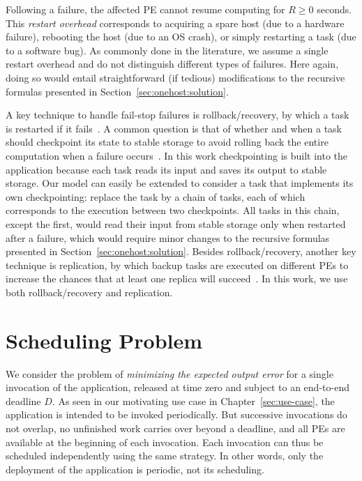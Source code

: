 Following a failure, the affected PE cannot resume computing for $R{\geq}
0$ seconds. This \emph{restart overhead} corresponds to acquiring a spare
host (due to a hardware failure), rebooting the host (due to an OS
crash), or simply restarting a task (due to a software bug).  As
commonly done in the literature, we assume a single restart overhead and do
not distinguish different types of failures. Here again, doing so would
entail straightforward (if tedious) modifications to the recursive
formulas presented in Section~\ref{sec:onehost:solution}.

A key technique to handle fail-stop failures is rollback/recovery, by
which a task is restarted if it fails~\cite{10.5555/2811302}.  A common
question is that of whether and when a task should
checkpoint its state to stable storage to avoid rolling back the entire
computation when a failure occurs~\cite{BAUTISTAGOMEZ2024315}.  In this
work checkpointing is built into the application because each task reads
its input and saves its output to stable storage.  Our model can easily
be extended to consider a task that implements its own checkpointing:
replace the task by a chain of tasks, each of which corresponds to the
execution between two checkpoints. All tasks in this chain, except the
first, would read their input from stable storage only when restarted
after a failure, which would require minor changes to the recursive
formulas presented in Section~\ref{sec:onehost:solution}.  Besides
rollback/recovery, another key technique is replication, by which backup
tasks are executed on different PEs to increase the chances that at least
one replica will succeed~\cite{10.5555/2811302}.  In this work, we 
use both rollback/recovery and replication.



\section{Scheduling Problem}
\label{sec:problem-scheduling}

We consider the problem of \emph{minimizing the expected output error} for
a single invocation of the application, released at time zero and subject
to an end-to-end deadline $D$.  As seen in our motivating use case in
Chapter~\ref{sec:use-case}, the application is intended to be invoked
periodically. But successive invocations do not overlap, no unfinished work
carries over beyond a deadline, and all PEs are available at the beginning
of each invocation.  Each invocation can thus be scheduled independently
using the same strategy. In other words, only the deployment of the
application is periodic, not its scheduling.

